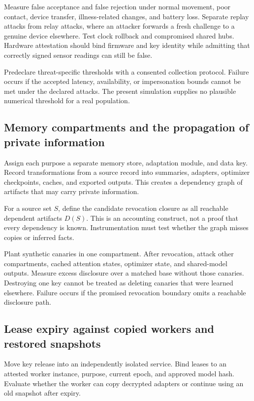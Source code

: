 \documentclass[11pt]{article}
\begin{document}
Measure false acceptance and false rejection under normal movement, poor contact, device transfer, illness-related changes, and battery loss.
Separate replay attacks from relay attacks, where an attacker forwards a fresh challenge to a genuine device elsewhere.
Test clock rollback and compromised shared hubs.
Hardware attestation should bind firmware and key identity while admitting that correctly signed sensor readings can still be false.

Predeclare threat-specific thresholds with a consented collection protocol.
Failure occurs if the accepted latency, availability, or impersonation bounds cannot be met under the declared attacks.
The present simulation supplies no plausible numerical threshold for a real population.

\subsection{Memory compartments and the propagation of private information}
Assign each purpose a separate memory store, adaptation module, and data key.
Record transformations from a source record into summaries, adapters, optimizer checkpoints, caches, and exported outputs.
This creates a dependency graph of artifacts that may carry private information.

For a source set $S$, define the candidate revocation closure as all reachable dependent artifacts $D(S)$.
This is an accounting construct, not a proof that every dependency is known.
Instrumentation must test whether the graph misses copies or inferred facts.

Plant synthetic canaries in one compartment.
After revocation, attack other compartments, cached attention states, optimizer state, and shared-model outputs.
Measure excess disclosure over a matched base without those canaries.
Destroying one key cannot be treated as deleting canaries that were learned elsewhere.
Failure occurs if the promised revocation boundary omits a reachable disclosure path.

\subsection{Lease expiry against copied workers and restored snapshots}
Move key release into an independently isolated service.
Bind leases to an attested worker instance, purpose, current epoch, and approved model hash.
Evaluate whether the worker can copy decrypted adapters or continue using an old snapshot after expiry.
\end{document}
